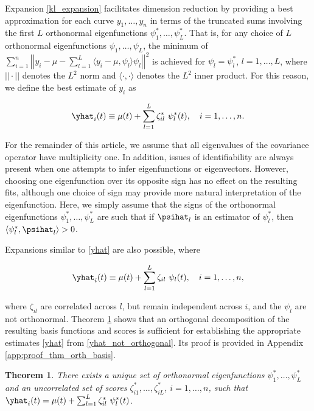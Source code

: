 \documentclass[12pt]{article}
\theoremstyle{plain}
\newtheorem{theorem}{Theorem}[section]
\theoremstyle{definition}
\theoremstyle{remark}
\begin{document}
Expansion \eqref{kl_expansion} facilitates dimension reduction by providing a best approximation for each
curve $y_1, \dots, y_n$ in terms of the truncated sums involving the first $L$ orthonormal eigenfunctions
$\psi^*_1, \dots, \psi^*_L$. That is, for any choice of $L$ orthonormal eigenfunctions $\psi_1, \dots, \psi_L$, the
minimum of $\sum_{i=1}^n \left|\left| y_i - \mu - \sum_{l=1}^L \langle y_i - \mu , \psi_l \rangle \psi_l \right|\right|^2$
is achieved for $\psi_l = \psi^*_l$, $l = 1, \dots, L$, where $|| \cdot ||$ denotes the $L^2$ norm and
$\langle \cdot, \cdot \rangle$ denotes the $L^2$ inner product. For this reason, we define the best estimate of
$y_i$ as

\begin{equation}
	\yhat_i (t) \equiv \mu (t) + \sum_{l=1}^L \zeta^*_{il} \ \psi^*_l (t), \quad i = 1, \dots, n.
\label{yhat}
\end{equation}

For the remainder of this article, we assume that all eigenvalues of the covariance operator have multiplicity one.
In addition, issues of identifiability are always present when one attempts to infer eigenfunctions or eigenvectors.
However, choosing one eigenfunction over its opposite sign has no effect on the resulting fits, although one choice
of sign may provide more natural interpretation of the eigenfunction. Here, we simply assume that
the signs of the orthonormal eigenfunctions $\psi^*_1, \dots, \psi^*_L$ are such that if $\psihat_l$ is an
estimator of $\psi^*_l$, then $\langle \psi^*_l , \psihat_l \rangle > 0$.

Expansions similar to \eqref{yhat} are also possible, where

\begin{equation}
	\yhat_i (t) \equiv \mu (t) + \sum_{l=1}^L \zeta_{il} \ \psi_l (t), \quad i = 1, \dots, n,
\label{yhat_not_orthogonal}
\end{equation}

\noindent where $\zeta_{il}$ are correlated across $l$, but remain independent across $i$, and the $\psi_l$ are not
orthonormal. Theorem \ref{thm:orth_basis} shows that an orthogonal decomposition of the resulting basis functions
and scores is sufficient for establishing the appropriate estimates \eqref{yhat} from \eqref{yhat_not_orthogonal}.
Its proof is provided in Appendix \ref{app:proof_thm_orth_basis}.

\begin{theorem}
	
	There exists a unique set of orthonormal
	eigenfunctions $\psi^*_1, \dots, \psi^*_L$ and an uncorrelated set of scores $\zeta^*_{i1}, \dots, \zeta^*_{iL}$,
	$i = 1, \dots, n$, such that $\yhat_i (t) = \mu (t) + \sum_{l=1}^L \zeta^*_{il} \ \psi^*_l (t)$.
	
\label{thm:orth_basis}
\end{theorem}
\end{document}

